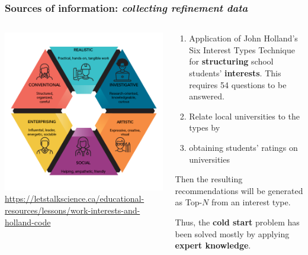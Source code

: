 \documentclass[10pt,dvipsnames]{beamer}
\begin{document}
\begin{frame}
  \frametitle{Sources of information: \emph{collecting refinement data}}
  \begin{columns}
    \begin{column}{0.4\linewidth}
      \includegraphics[width=0.9\linewidth]{pics/holland_hexagon.png}
      {\tiny\url{https://letstalkscience.ca/educational-resources/lessons/work-interests-and-holland-code}}
    \end{column}
    \begin{column}{0.6\linewidth}
      \begin{enumerate}
      \item Application of John Holland's Six Interest Types Technique for \textbf{structuring} school students' \textbf{interests}. This requires 54 questions to be answered.
      \item Relate local universities to the types by
      \item obtaining students' ratings on universities
      \end{enumerate}
      Then the resulting recommendations will be generated as Top-$N$ from an interest type.

      Thus, the \textbf{cold start} problem has been solved mostly by applying \textbf{expert knowledge}.
    \end{column}
  \end{columns}
\end{frame}
\end{document}

